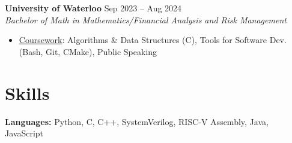 \documentclass[10pt,letterpaper]{article}
\begin{document}

\raggedright
\textbf{University of Waterloo} \hfill
Sep 2023 -- Aug 2024 \\
\textit{Bachelor of Math in Mathematics/Financial Analysis and Risk Management} \hfill
\begin{itemize}
    \item \underline{Coursework}: 
    Algorithms \& Data Structures (C), 
    Tools for Software Dev. (Bash, Git, CMake), 
    Public Speaking
\end{itemize}













\section{Skills}

\hspace{0.75em}\textbf{Languages:} 
    Python, C, C++, SystemVerilog, RISC-V Assembly, Java, JavaScript \\
\end{document}

